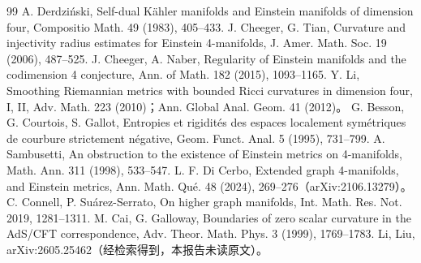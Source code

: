 \begin{thebibliography}{99}
 A. Derdziński, Self-dual Kähler manifolds and Einstein manifolds of dimension four, Compositio Math. 49 (1983), 405--433.
 J. Cheeger, G. Tian, Curvature and injectivity radius estimates for Einstein 4-manifolds, J. Amer. Math. Soc. 19 (2006), 487--525.
 J. Cheeger, A. Naber, Regularity of Einstein manifolds and the codimension 4 conjecture, Ann. of Math. 182 (2015), 1093--1165.
 Y. Li, Smoothing Riemannian metrics with bounded Ricci curvatures in dimension four, I, II, Adv. Math. 223 (2010)；Ann. Global Anal. Geom. 41 (2012)。
 G. Besson, G. Courtois, S. Gallot, Entropies et rigidités des espaces localement symétriques de courbure strictement négative, Geom. Funct. Anal. 5 (1995), 731--799.
 A. Sambusetti, An obstruction to the existence of Einstein metrics on 4-manifolds, Math. Ann. 311 (1998), 533--547.
 L. F. Di Cerbo, Extended graph 4-manifolds, and Einstein metrics, Ann. Math. Qué. 48 (2024), 269--276（arXiv:2106.13279）。
 C. Connell, P. Suárez-Serrato, On higher graph manifolds, Int. Math. Res. Not. 2019, 1281--1311.
 M. Cai, G. Galloway, Boundaries of zero scalar curvature in the AdS/CFT correspondence, Adv. Theor. Math. Phys. 3 (1999), 1769--1783.
 Li, Liu, arXiv:2605.25462（经检索得到，本报告未读原文）。
\end{thebibliography}
